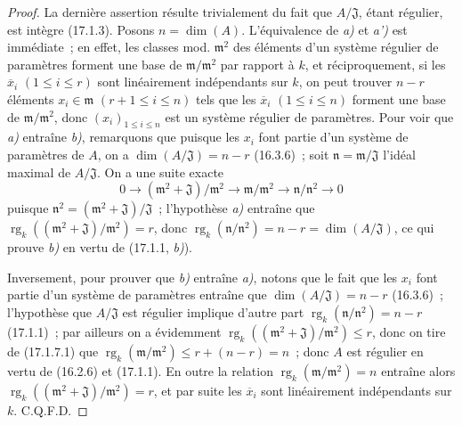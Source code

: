 \begin{proof}
La dernière assertion résulte trivialement du fait que $A/\mathfrak{J}$,
étant régulier, est intègre (17.1.3). Posons $n=\dim(A)$. L'équivalence de \emph{a)}
et \emph{a')} est immédiate~; en effet, les classes mod. $\mathfrak{m}^2$ des éléments
d'un système régulier de paramètres forment une base de
$\mathfrak{m}/\mathfrak{m}^2$ par rapport à $k$, et réciproquement, si les
$\overline{x}_i$ $(1\leq i\leq r)$ sont linéairement indépendants sur $k$, on
peut trouver $n-r$ éléments $x_i\in\mathfrak{m}$ $(r+1\leq i\leq n)$ tels que
les $\overline{x}_i$ $(1\leq i\leq n)$ forment une base de
$\mathfrak{m}/\mathfrak{m}^2$, donc $(x_i)_{1\leq i\leq n}$ est un système
régulier de paramètres. Pour voir que \emph{a)} entraîne \emph{b)}, remarquons que puisque
les $x_i$ font partie d'un système de paramètres de $A$, on a
$\dim(A/\mathfrak{J})=n-r$ (16.3.6)~; soit
$\mathfrak{n}=\mathfrak{m}/\mathfrak{J}$ l'idéal maximal de
$A/\mathfrak{J}$. On a une suite exacte
\begin{equation}
\label{0.17.1.7.1-fr}
\tag{17.1.7.1}
  0\longrightarrow(\mathfrak{m}^2+\mathfrak{J})/\mathfrak{m}^2
  \longrightarrow\mathfrak{m}/\mathfrak{m}^2
  \longrightarrow\mathfrak{n}/\mathfrak{n}^2\longrightarrow0
\end{equation}
puisque $\mathfrak{n}^2=(\mathfrak{m}^2+\mathfrak{J})/\mathfrak{J}$~;
l'hypothèse \emph{a)} entraîne que
$\operatorname{rg}_k((\mathfrak{m}^2+\mathfrak{J})/\mathfrak{m}^2)=r$, donc
$\operatorname{rg}_k(\mathfrak{n}/\mathfrak{n}^2)=n-r
=\dim(A/\mathfrak{J})$, ce qui prouve \emph{b)} en vertu de (17.1.1, \emph{b)}).

Inversement, pour prouver que \emph{b)} entraîne \emph{a)}, notons que le fait que les $x_i$
font partie d'un système de paramètres entraîne que
$\dim(A/\mathfrak{J})=n-r$ (16.3.6)~; l'hypothèse que $A/\mathfrak{J}$ est
régulier implique d'autre part
$\operatorname{rg}_k(\mathfrak{n}/\mathfrak{n}^2)=n-r$ (17.1.1)~; par ailleurs
on a évidemment
$\operatorname{rg}_k((\mathfrak{m}^2+\mathfrak{J})/\mathfrak{m}^2)\leq r$,
donc on tire de (17.1.7.1) que
$\operatorname{rg}_k(\mathfrak{m}/\mathfrak{m}^2)\leq r+(n-r)=n$~; donc $A$
est régulier en vertu de (16.2.6) et (17.1.1). En outre la relation
$\operatorname{rg}_k(\mathfrak{m}/\mathfrak{m}^2)=n$ entraîne alors
$\operatorname{rg}_k((\mathfrak{m}^2+\mathfrak{J})/\mathfrak{m}^2)=r$, et par
suite les $\overline{x}_i$ sont linéairement indépendants sur $k$. C.Q.F.D.
\end{proof}

